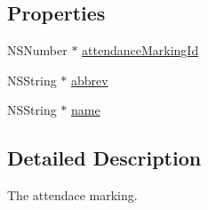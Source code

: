 \subsection*{Properties}
\begin{DoxyCompactItemize}
\item 
N\+S\+Number $\ast$ \hyperlink{interface_attendance_marking_a211012d0e662142f3b002b57f133b0db}{attendance\+Marking\+Id}
\item 
N\+S\+String $\ast$ \hyperlink{interface_attendance_marking_af637cdd49ba462876b3fe6e6957049fc}{abbrev}
\item 
N\+S\+String $\ast$ \hyperlink{interface_attendance_marking_a235155acb5a8b489b9829a09b6ac4b93}{name}
\end{DoxyCompactItemize}


\subsection{Detailed Description}
The attendace marking. 

